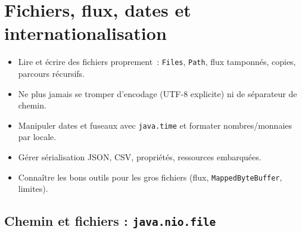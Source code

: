 \chapter{Fichiers, flux, dates et internationalisation}
\label{ch-java-io}

\begin{objectif}
\begin{itemize}
  \item Lire et \'ecrire des fichiers proprement~: \verb|Files|, \verb|Path|, flux tamponn\'es,
        copies, parcours r\'ecursifs.
  \item Ne plus jamais se tromper d'encodage (UTF-8 explicite) ni de s\'eparateur de chemin.
  \item Manipuler dates et fuseaux avec \verb|java.time| et formater nombres/monnaies par locale.
  \item G\'erer s\'erialisation JSON, CSV, propri\'et\'es, ressources embarqu\'ees.
  \item Conna\^itre les bons outils pour les gros fichiers (flux, \verb|MappedByteBuffer|, limites).
\end{itemize}
\end{objectif}

\section{Chemin et fichiers : \texttt{java.nio.file}}

